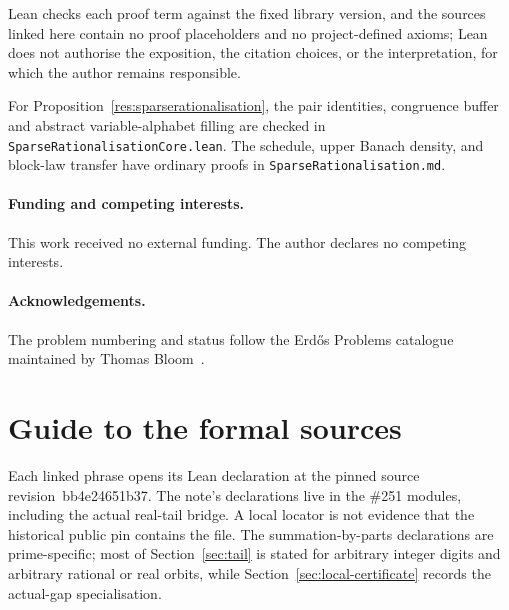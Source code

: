 \documentclass[11pt]{article}
\renewcommand{\commitshort}{bb4e24651b37}
\begin{document}
Lean checks each proof term against the fixed library
version, and the sources linked here contain no proof placeholders and no
project-defined axioms; Lean does not authorise the exposition, the citation
choices, or the interpretation, for which the author remains responsible.

For Proposition~\ref{res:sparserationalisation}, the pair identities,
congruence buffer and abstract variable-alphabet filling are checked in
\texttt{SparseRationalisationCore.lean}.  The schedule, upper Banach density,
and block-law transfer have ordinary proofs in
\texttt{SparseRationalisation.md}.

\paragraph{Funding and competing interests.} This work received no external
funding.  The author declares no competing interests.

\paragraph{Acknowledgements.} The problem numbering and status follow the
Erd\H{o}s Problems catalogue maintained by Thomas Bloom~\cite{erdosproblems}.

\appendix
\section{Guide to the formal sources}\label{app:index}

Each linked phrase opens its Lean declaration at the pinned source
revision~\commitshort.  The note's declarations live in the \#251 modules,
including the actual real-tail bridge.  A local locator is not evidence that
the historical public pin contains the file.  The summation-by-parts
declarations are prime-specific; most of Section~\ref{sec:tail} is stated for
arbitrary integer digits and arbitrary rational or real orbits, while
Section~\ref{sec:local-certificate} records the actual-gap specialisation.

\iffalse
\end{document}
